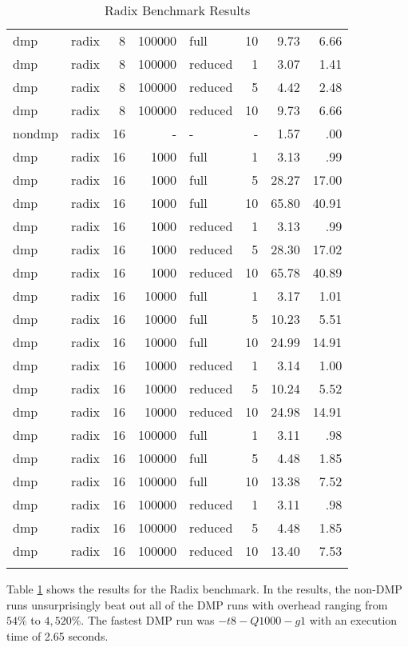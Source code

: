 \begin{center}
\begin{small}
\begin{longtable}{llrrlrrr}
dmp & radix & 8 & 100000 & full & 10 & 9.73 & 6.66\\
dmp & radix & 8 & 100000 & reduced & 1 & 3.07 & 1.41\\
dmp & radix & 8 & 100000 & reduced & 5 & 4.42 & 2.48\\
dmp & radix & 8 & 100000 & reduced & 10 & 9.73 & 6.66\\
\hline
nondmp & radix & 16 & - & - & - & 1.57 & .00\\
dmp & radix & 16 & 1000 & full & 1 & 3.13 & .99\\
dmp & radix & 16 & 1000 & full & 5 & 28.27 & 17.00\\
dmp & radix & 16 & 1000 & full & 10 & 65.80 & 40.91\\
dmp & radix & 16 & 1000 & reduced & 1 & 3.13 & .99\\
dmp & radix & 16 & 1000 & reduced & 5 & 28.30 & 17.02\\
dmp & radix & 16 & 1000 & reduced & 10 & 65.78 & 40.89\\
dmp & radix & 16 & 10000 & full & 1 & 3.17 & 1.01\\
dmp & radix & 16 & 10000 & full & 5 & 10.23 & 5.51\\
dmp & radix & 16 & 10000 & full & 10 & 24.99 & 14.91\\
dmp & radix & 16 & 10000 & reduced & 1 & 3.14 & 1.00\\
dmp & radix & 16 & 10000 & reduced & 5 & 10.24 & 5.52\\
dmp & radix & 16 & 10000 & reduced & 10 & 24.98 & 14.91\\
dmp & radix & 16 & 100000 & full & 1 & 3.11 & .98\\
dmp & radix & 16 & 100000 & full & 5 & 4.48 & 1.85\\
dmp & radix & 16 & 100000 & full & 10 & 13.38 & 7.52\\
dmp & radix & 16 & 100000 & reduced & 1 & 3.11 & .98\\
dmp & radix & 16 & 100000 & reduced & 5 & 4.48 & 1.85\\
dmp & radix & 16 & 100000 & reduced & 10 & 13.40 & 7.53\\
\hline
\caption{Radix Benchmark Results}
\label{tab:radix_results}
\end{longtable}
\end{small}
\end{center}

Table \ref{tab:radix_results} shows the results for the Radix
benchmark.  In the results, the non-DMP runs unsurprisingly beat out
all of the DMP runs with overhead ranging from $54\%$ to $4,520\%$.
The fastest DMP run was $-t8 -Q1000 -g1$ with an execution time of
2.65 seconds.

